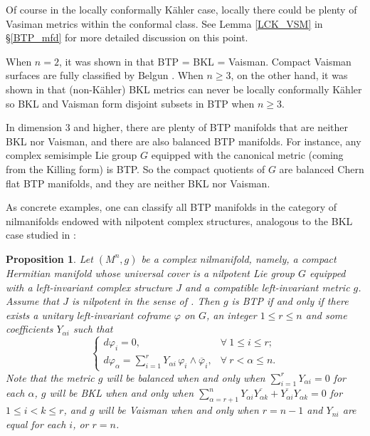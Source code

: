 \documentclass{amsart}
\numberwithin{equation}{section}
\newtheorem{proposition}[theorem]{Proposition}
\theoremstyle{definition}
\renewcommand{\1}{\mathds{1}}
\renewcommand{\>}{\rightarrow}
\begin{document}
Of course in the locally conformally K\"ahler case, locally there could be plenty of Vasiman metrics within the conformal class.
See Lemma \ref{LCK_VSM} in \S \ref{BTP_mfd} for more detailed discussion on this point.

When $n=2$, it was shown in \cite{ZhaoZ19Str} that BTP = BKL = Vaisman.
Compact Vaisman surfaces are fully classified by Belgun \cite{B00}.
When $n\geq 3$, on the other hand, it was shown in \cite{YZZ} that
(non-K\"ahler) BKL metrics can never be locally conformally K\"ahler
so BKL and Vaisman form disjoint subsets in BTP when $n\geq 3$.

In dimension $3$ and higher, there are plenty of BTP manifolds that are neither BKL nor Vaisman, and there are also balanced BTP manifolds. For instance, any complex semisimple Lie group $G$ equipped with the canonical metric (coming from the Killing form) is BTP. So the compact quotients of $G$ are balanced Chern flat BTP manifolds, and they are neither BKL nor Vaisman.

As concrete examples, one can classify all BTP manifolds in the category of nilmanifolds endowed with nilpotent complex structures, analogous to the BKL case studied in \cite{ZhaoZ19Nil}:

\begin{proposition}\label{prop1.10}
Let $(M^n,g)$ be a complex nilmanifold, namely, a compact Hermitian manifold whose universal cover is a nilpotent Lie group $G$ equipped with a left-invariant complex structure $J$ and a compatible left-invariant metric $g$. Assume that $J$ is nilpotent in the sense of \cite{CFGU}. Then $g$ is BTP if and only if there exists a unitary left-invariant coframe $\varphi$ on $G$, an integer $1\leq r\leq n$ and some coefficients $Y_{\alpha i}$ such that
\begin{equation*}
\begin{cases}
d\varphi_i=0,   &\forall \ 1\leq i\leq r;\  \\
d\varphi_{\alpha} = \sum\limits_{i=1}^r Y_{\alpha i}\,\varphi_i \wedge \overline{\varphi}_i,  & \forall\ r<\alpha \leq n.
\end{cases}
\end{equation*}
Note that the metric $g$ will be balanced when and only when $\sum_{i=1}^r Y_{\alpha i}=0$ for each $\alpha$,
$g$ will be BKL when and only when $\sum_{\alpha=r+1}^n Y_{\alpha i}\overline{Y_{\alpha k}} + \overline{Y_{\alpha i}} Y_{\alpha k} =0$
for $1 \leq i < k \leq r$,
and $g$ will be Vaisman when and only when $r = n-1$ and $Y_{ni}$ are equal for each $i$, or $r=n$.
\end{proposition}
\end{document}
